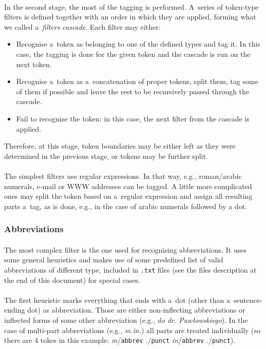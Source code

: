 \documentclass[oneside,12pt]{article}
\begin{document}
\paragraph{}
In the second stage, the most of the tagging is performed. A~series of token-type filters is defined together with an order in which they are applied, forming what we called a~\textit{filters cascade}. Each filter may either:
    \begin{itemize}
        \item Recognise a~token as belonging to one of the defined types and tag it. In this case, the tagging is done for the given token and the cascade is run on the next token.
        \item Recognise a~token as a~concatenation of proper tokens, split them, tag some of them if possible and leave the rest to be recursively passed through the cascade.
        \item Fail to recognise the token: in this case, the next filter from the cascade is applied.
    \end{itemize}

Therefore, at this stage, token boundaries may be either left as they were determined in the previous stage, or tokens may be further split.
    
\paragraph{}
The simplest filters use regular expressions. In that way, e.g., roman/arabic numerals, e-mail or WWW addresses can be tagged. A little more complicated ones may split the token based on a~regular expression and assign all resulting parts a~tag, as is done, e.g., in the case of arabic numerals followed by a dot.

\subsubsection{Abbreviations}

\paragraph{}
The most complex filter is the one used for recognising abbreviations. It uses some general heuristics and makes use of some predefined list of valid abbreviations of different type, included in \texttt{.txt} files (see the files description at the end of this document) for special cases.

\paragraph{}
The first heuristic marks everything that ends with a~dot (other than a~sentence-ending dot) as abbreviation. Those are either non-inflecting abbreviations or inflected forms of some other abbreviation (e.g., \textit{do dr. Pawłowskiego}). In the case of multi-part abbreviations (e.g., \textit{m.in.}) all parts are treated individually (so there are 4 tokes in this example: \textit{m}/\texttt{abbrev} \textit{.}/\texttt{punct} \textit{in}/\texttt{abbrev} \textit{.}/\texttt{punct}).
\end{document}
